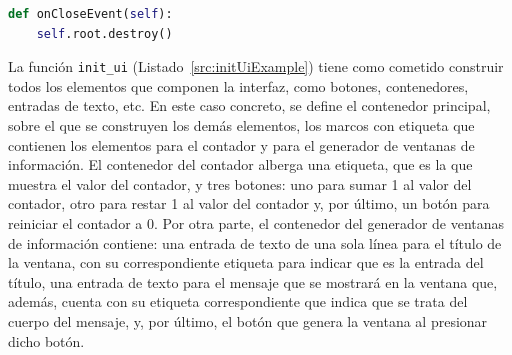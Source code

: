 \begin{lstlisting}[language=Python,
                   style=python,
                   frame=none,
                   numbers=none,
                   basicstyle=\ttfamily\normalsize,
                   caption={Función \texttt{onCloseEvent} del ejemplo de Tkinter},
                   label=src:onCloseEventExample,
                   inputencoding=utf8]                   
def onCloseEvent(self):
    self.root.destroy()
\end{lstlisting}

La función \texttt{init\_ui} (Listado~\ref{src:initUiExample}) tiene como cometido construir todos los elementos que componen la interfaz, como botones, contenedores, entradas de texto, etc. En este caso concreto, se define el contenedor principal, sobre el que se construyen los demás elementos, los marcos con etiqueta que contienen los elementos para el contador y para el generador de ventanas de información. El contenedor del contador alberga una etiqueta, que es la que muestra el valor del contador, y tres botones: uno para sumar 1 al valor del contador, otro para restar 1 al valor del contador y, por último, un botón para reiniciar el contador a 0. Por otra parte, el contenedor del generador de ventanas de información contiene: una entrada de texto de una sola línea para el título de la ventana, con su correspondiente etiqueta para indicar que es la entrada del título, una entrada de texto para el mensaje que se mostrará en la ventana que, además, cuenta con su etiqueta correspondiente que indica que se trata del cuerpo del mensaje, y, por último, el botón que genera la ventana al presionar dicho botón.

